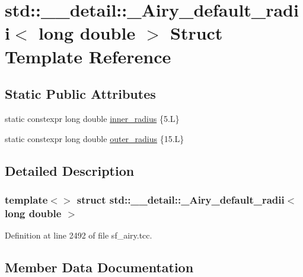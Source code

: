 \hypertarget{structstd_1_1____detail_1_1__Airy__default__radii_3_01long_01double_01_4}{}\section{std\+:\+:\+\_\+\+\_\+detail\+:\+:\+\_\+\+Airy\+\_\+default\+\_\+radii$<$ long double $>$ Struct Template Reference}
\label{structstd_1_1____detail_1_1__Airy__default__radii_3_01long_01double_01_4}
\subsection*{Static Public Attributes}
\begin{DoxyCompactItemize}
\item 
static constexpr long double \hyperlink{structstd_1_1____detail_1_1__Airy__default__radii_3_01long_01double_01_4_a59d4d304728aa4ac3669fc967a9e69a9}{inner\+\_\+radius} \{5.\+L\}
\item 
static constexpr long double \hyperlink{structstd_1_1____detail_1_1__Airy__default__radii_3_01long_01double_01_4_ab46784c2c76dc0f43aeb85d22f8b21a7}{outer\+\_\+radius} \{15.\+L\}
\end{DoxyCompactItemize}


\subsection{Detailed Description}
\subsubsection*{template$<$$>$\newline
struct std\+::\+\_\+\+\_\+detail\+::\+\_\+\+Airy\+\_\+default\+\_\+radii$<$ long double $>$}



Definition at line 2492 of file sf\+\_\+airy.\+tcc.



\subsection{Member Data Documentation}
\mbox{\label{structstd_1_1____detail_1_1__Airy__default__radii_3_01long_01double_01_4_a59d4d304728aa4ac3669fc967a9e69a9}} 
